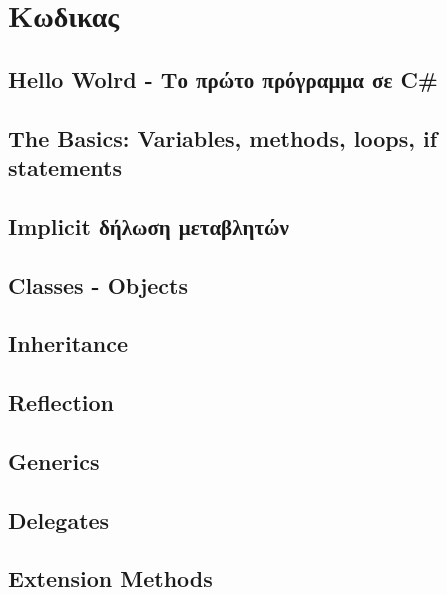 \section{Κωδικας}

\subsection{Hello Wolrd - Το πρώτο πρόγραμμα σε C\#}
\label{Hello World}


\subsection{The Basics: Variables, methods, loops, if statements}
\label{Basics}


\subsection{Implicit δήλωση μεταβλητών}
\label{implicitdeclaration}


\subsection{Classes - Objects}
\label{Classes - Objects}


\subsection{Inheritance}
\label{inheritance}


\subsection{Reflection}
\label{reflection}


\subsection{Generics}
\label{generics}


\subsection{Delegates}
\label{delegates}


\subsection{Extension Methods}
\label{extension}


